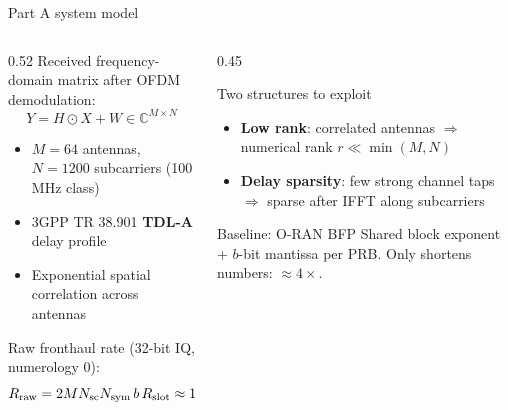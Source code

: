 \documentclass[aspectratio=169,11pt,xcolor=table]{beamer}
\begin{document}
\begin{frame}{Part A system model}
  \begin{columns}[T]
    \begin{column}{0.52\textwidth}
      Received frequency-domain matrix after OFDM demodulation:
      \[
        Y = H \odot X + W \in \mathbb{C}^{M\times N}
      \]
      \begin{itemize}
        \item $M = 64$ antennas, $N = 1200$ subcarriers (100\,MHz class)
        \item 3GPP TR 38.901 \textbf{TDL-A} delay profile
        \item Exponential spatial correlation across antennas
      \end{itemize}
      Raw fronthaul rate (32-bit IQ, numerology 0):
      \[
        R_{\rm raw} = 2 M N_{\rm sc} N_{\rm sym}\, b\, R_{\rm slot} \approx 15.36~\text{Gbit/s/cell}
      \]
    \end{column}
    \begin{column}{0.45\textwidth}
      \begin{block}{Two structures to exploit}
        \begin{itemize}
          \item \textbf{Low rank}: correlated antennas $\Rightarrow$ numerical rank $r \ll \min(M,N)$
          \item \textbf{Delay sparsity}: few strong channel taps $\Rightarrow$ sparse after IFFT along subcarriers
        \end{itemize}
      \end{block}
      \begin{block}{Baseline: O-RAN BFP}
        Shared block exponent + $b$-bit mantissa per PRB. Only shortens numbers: $\approx 4\times$.
      \end{block}
    \end{column}
  \end{columns}
\end{frame}
\end{document}
